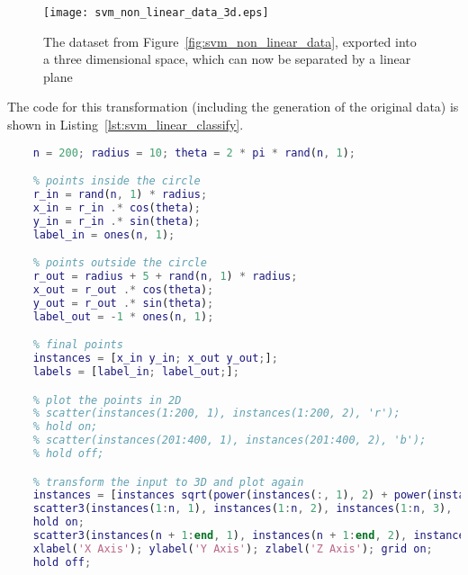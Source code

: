 \begin{figure}[t!]
    \centering
    \texttt{[image: svm\_non\_linear\_data\_3d.eps]}
    \caption{The dataset from Figure~\ref{fig:svm_non_linear_data}, exported into a three dimensional space, which can now be separated by a linear plane}
    \label{fig:svm_non_linear_data_3d}
\end{figure}

The code for this transformation (including the generation of the original data) is shown in Listing~\ref{lst:svm_linear_classify}.

\begin{lstlisting}[language=Matlab,frame=single,captionpos=b,caption={Generating the dataset to be classified by a linear classifier},label={lst:svm_linear_classify}]
    % constants
    n = 200; radius = 10; theta = 2 * pi * rand(n, 1);

    % points inside the circle
    r_in = rand(n, 1) * radius;
    x_in = r_in .* cos(theta);
    y_in = r_in .* sin(theta);
    label_in = ones(n, 1);

    % points outside the circle
    r_out = radius + 5 + rand(n, 1) * radius;
    x_out = r_out .* cos(theta);
    y_out = r_out .* sin(theta);
    label_out = -1 * ones(n, 1);

    % final points
    instances = [x_in y_in; x_out y_out;];
    labels = [label_in; label_out;];

    % plot the points in 2D
    % scatter(instances(1:200, 1), instances(1:200, 2), 'r');
    % hold on;
    % scatter(instances(201:400, 1), instances(201:400, 2), 'b');
    % hold off;

    % transform the input to 3D and plot again
    instances = [instances sqrt(power(instances(:, 1), 2) + power(instances(:, 2), 2))];
    scatter3(instances(1:n, 1), instances(1:n, 2), instances(1:n, 3), 'r');
    hold on;
    scatter3(instances(n + 1:end, 1), instances(n + 1:end, 2), instances(n + 1:end, 3), 'b');
    xlabel('X Axis'); ylabel('Y Axis'); zlabel('Z Axis'); grid on;
    hold off;
\end{lstlisting}
